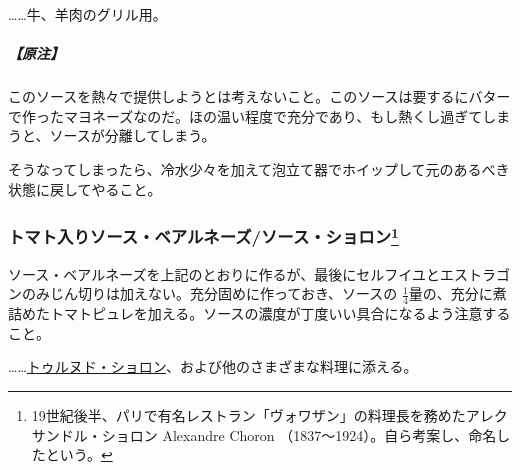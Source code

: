 \begin{recette}
\ldots{}\ldots{}牛、羊肉のグリル用。

\hypertarget{nota-sauce-bearnaise}{%
\subparagraph{【原注】}\label{nota-sauce-bearnaise}}

このソースを熱々で提供しようとは考えないこと。このソースは要するにバターで作ったマヨネーズなのだ。ほの温い程度で充分であり、もし熱くし過ぎてしまうと、ソースが分離してしまう。

そうなってしまったら、冷水少々を加えて泡立て器でホイップして元のあるべき状態に戻してやること。

\hypertarget{sauce-bearnaise-tomatee}{%
\subsubsection[トマト入りソース・ベアルネーズ/ソース・ショロン]{\texorpdfstring{トマト入りソース・ベアルネーズ/ソース・ショロン\footnote{19世紀後半、パリで有名レストラン「ヴォワザン」の料理長を務めたアレクサンドル・ショロン
  Alexandre Choron （1837〜1924）。自ら考案し、命名したという。}}{トマト入りソース・ベアルネーズ/ソース・ショロン}}\label{sauce-bearnaise-tomatee}}



ソース・ベアルネーズを上記のとおりに作るが、最後にセルフイユとエストラゴンのみじん切りは加えない。充分固めに作っておき、ソースの
\(\frac{1}{4}\)量の、充分に煮詰めたトマトピュレを加える。ソースの濃度が丁度いい具合になるよう注意すること。

\ldots{}\ldots{}\protect\hyperlink{tournedos-choron}{トゥルヌド・ショロン}、および他のさまざまな料理に添える。

\hypertarget{sauce-bearnaise-a-la-glace-de-viande}{%
}
\end{recette}
